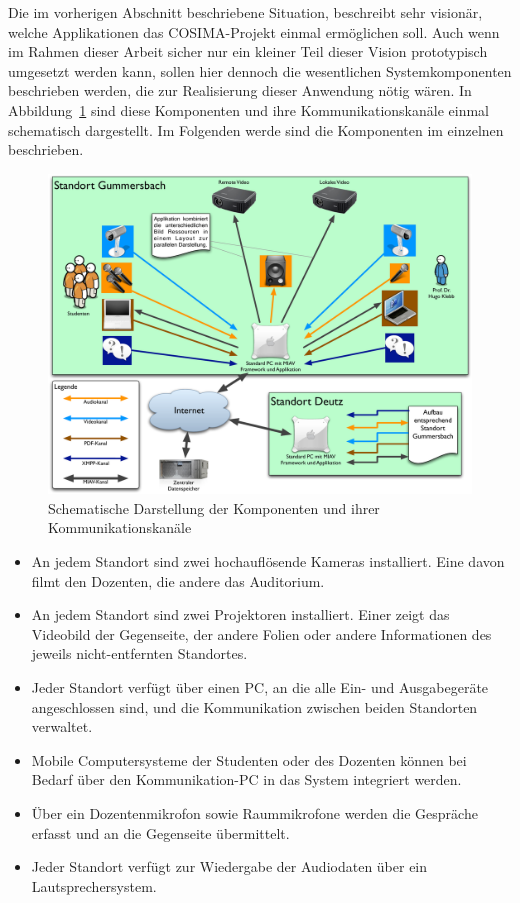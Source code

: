  Die im vorherigen Abschnitt beschriebene Situation, beschreibt sehr visionär, welche Applikationen das COSIMA-Projekt einmal ermöglichen soll. Auch wenn im Rahmen dieser Arbeit sicher nur ein kleiner Teil dieser Vision prototypisch umgesetzt werden kann, sollen hier dennoch die wesentlichen Systemkomponenten beschrieben werden, die zur Realisierung dieser Anwendung nötig wären. In Abbildung~\ref{fig:images_Hardware_und_Kanaele} sind diese Komponenten und ihre Kommunikationskanäle einmal schematisch dargestellt. Im Folgenden werde sind die Komponenten im einzelnen beschrieben.

  \begin{figure}[ht]
    \centering
      \includegraphics[width=.9\textwidth]{images/Hardware_und_Kanaele.pdf}
    \caption{Schematische Darstellung der Komponenten und ihrer Kommunikationskanäle}
    \label{fig:images_Hardware_und_Kanaele}
  \end{figure}
  
  \begin{itemize}
    \item An jedem Standort sind zwei hochauflösende Kameras installiert. Eine davon filmt den Dozenten, die andere das Auditorium.
    \item An jedem Standort sind zwei Projektoren installiert. Einer zeigt das Videobild der Gegenseite, der andere Folien oder andere Informationen des jeweils nicht-entfernten Standortes.
    \item Jeder Standort verfügt über einen PC, an die alle Ein- und Ausgabegeräte angeschlossen sind, und die Kommunikation zwischen beiden Standorten verwaltet.
    \item Mobile Computersysteme der Studenten oder des Dozenten können bei Bedarf über den Kommunikation-PC in das System integriert werden.
    \item Über ein Dozentenmikrofon sowie Raummikrofone werden die Gespräche erfasst und an die Gegenseite übermittelt.
    \item Jeder Standort verfügt zur Wiedergabe der Audiodaten über ein Lautsprechersystem.
  \end{itemize}
  
